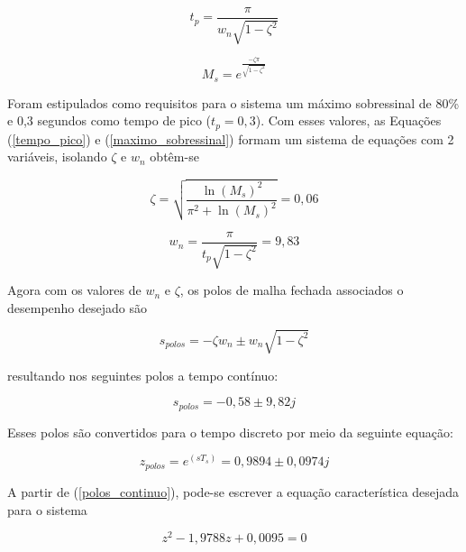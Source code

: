 \begin{equation}
    t_p=\frac{\pi}{w_n \sqrt{1-\zeta^2}}
    \label{tempo_pico}
\end{equation}

\begin{equation}
    M_s=e^\frac{-\zeta \pi}{\sqrt{1-\zeta^2}}
    \label{maximo_sobressinal}
\end{equation}

Foram estipulados como requisitos para o sistema um máximo sobressinal de 80\% e 0,3 segundos como tempo de pico ($t_p=0,3$). Com esses valores, as Equações (\ref{tempo_pico}) e (\ref{maximo_sobressinal}) formam um sistema de equações com 2 variáveis, isolando $\zeta$ e $w_n$ obtêm-se

\begin{equation}
    \zeta = \sqrt{\frac{\ln(M_s)^2}{\pi^2+\ln(M_s)^2}} =  0,06
    \label{zeta}
\end{equation}

\begin{equation}
    w_n = \frac{\pi}{t_p \sqrt{1-\zeta^2}} = 9,83
    \label{wn}
\end{equation}

Agora com os valores de $w_n$ e $\zeta$, os polos de malha fechada associados o desempenho desejado são

\begin{equation}
    s_{polos} = -\zeta w_n \pm w_n \sqrt{1-\zeta^2}
    \label{polos_malha_fechada}
\end{equation}

\noindent resultando nos seguintes polos a tempo contínuo:

\begin{equation}
    s_{polos} = -0,58 \pm 9,82 j
    \label{polos_continuo}
\end{equation}

Esses polos são convertidos para o tempo discreto por meio da seguinte equação:

\begin{equation}
    z_{polos} = e^{(s T_s)} = 0,9894 \pm 0,0974 j
    \label{polos_discreto}
\end{equation}

A partir de (\ref{polos_continuo}), pode-se escrever a equação característica desejada para o sistema

\begin{equation}
    z^2-1,9788z+0,0095 = 0
    \label{equacao_desejada}
\end{equation}

